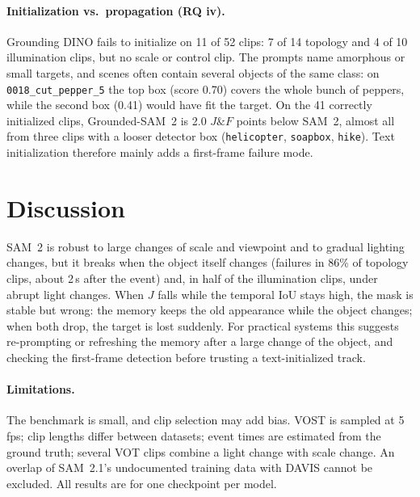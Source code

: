 \documentclass[11pt,a4paper]{article}
\newcommand{\sam}{SAM~2}
\newcommand{\gdsam}{Grounded-SAM~2}
\begin{document}
\paragraph{Initialization vs.\ propagation (RQ iv).}
Grounding DINO fails to initialize on 11 of 52 clips: 7 of 14 topology and 4
of 10 illumination clips, but no scale or control clip. The prompts name
amorphous or small targets, and scenes often contain several objects of the
same class: on \texttt{0018\_cut\_pepper\_5} the top box (score 0.70) covers
the whole bunch of peppers, while the second box (0.41) would have fit the
target. On the 41 correctly initialized clips, \gdsam{} is 2.0 $J\&F$ points
below \sam{}, almost all from three clips with a looser detector box
(\texttt{helicopter}, \texttt{soapbox}, \texttt{hike}). Text initialization
therefore mainly adds a first-frame failure mode.

\section{Discussion}
\sam{} is robust to large changes of scale and viewpoint and to gradual
lighting changes, but it breaks when the object itself changes (failures in
86\% of topology clips, about 2\,s after the event) and, in half of the
illumination clips, under abrupt light changes. When $J$
falls while the temporal IoU stays high, the mask is stable but wrong: the
memory keeps the old appearance while the object changes; when both drop, the
target is lost suddenly. For
practical systems this suggests re-prompting or refreshing the memory after a
large change of the object, and checking the first-frame detection before
trusting a text-initialized track.

\paragraph{Limitations.}
The benchmark is small, and clip selection may add bias. VOST is sampled at
5\,fps; clip lengths differ between datasets; event times are estimated
from the ground truth; several VOT clips combine a light change with scale
change. An overlap of \sam{}.1's undocumented training data with DAVIS cannot
be excluded. All results are for one checkpoint per model.
\end{document}
